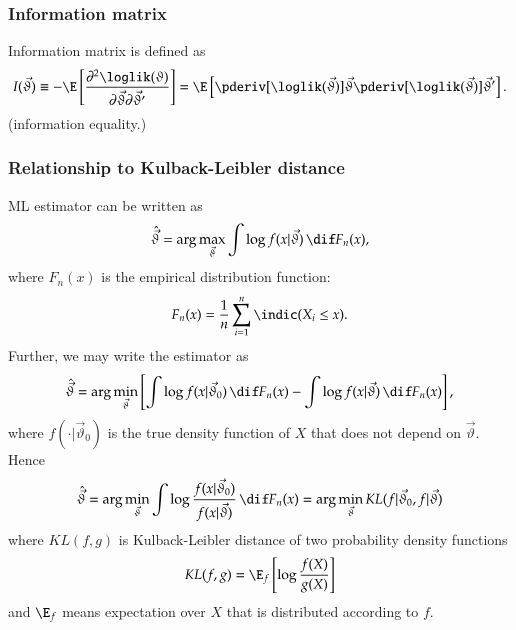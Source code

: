 \documentclass[a4paper]{article}
\numberwithin{equation}{subsection}
\begin{document}
\subsubsection{Information matrix}

Information matrix is defined as
\begin{equation}
  I(\vec{\vartheta})
  \equiv
  - \E \left[ 
    \frac{\partial^2 \loglik(\vartheta)}
    {\partial \vec{\vartheta} \partial \vec{\vartheta}'}
  \right]
  =
  \E \left[
    \pderiv[\loglik(\vec{\vartheta})]
    {\vec{\vartheta}}
    \pderiv[\loglik(\vec{\vartheta})]
    {\vec{\vartheta}'}
  \right].
\end{equation}
(information equality.)

\subsubsection{Relationship to Kulback-Leibler distance}

ML estimator can be written as
\begin{equation}
  \hat{\vec{\vartheta}}
  =
  \arg \max_{\vec{\vartheta}}
  \int \log f(x|\vec{\vartheta}) \,\dif F_n(x),
\end{equation}
where $F_n(x)$ is the empirical distribution function:
\begin{equation}
  F_n(x) 
  =
  \frac{1}{n}
  \sum_{i=1}^n
  \indic(X_i \le x).
\end{equation}
Further, we may write the estimator as
\begin{equation}
  \hat{\vec{\vartheta}}
  =
  \arg \min_{\vec{\vartheta}}
  \left[
    \int \log f(x|\vec{\vartheta}_{0}) \,\dif F_n(x)
    -
    \int \log f(x|\vec{\vartheta}) \,\dif F_n(x)
  \right],
\end{equation}
where $f(\cdot|\vec{\vartheta}_{0})$ is the true density function of
$X$ that does not depend on $\vec{\vartheta}$.  Hence
\begin{equation}
  \hat{\vec{\vartheta}}
  =
  \arg \min_{\vec{\vartheta}}
  \int 
  \log \frac{f(x|\vec{\vartheta}_{0})}{f(x|\vec{\vartheta})} 
  \,\dif F_n(x)
  =
  \arg \min_{\vec{\vartheta}}
  KL(f|\vec{\vartheta}_0, f |\vec{\vartheta})
\end{equation}
where $KL(f,g)$ is Kulback-Leibler distance of two probability density
functions 
\begin{equation}
  KL(f,g) 
  = 
  \E_f 
  \left[
    \log \frac{f(X)}{g(X)}
  \right]
\end{equation}
and $\E_{f}$ means expectation over $X$ that is distributed according
to $f$.
\end{document}
